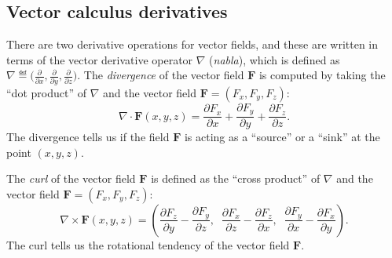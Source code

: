 	\subsection{Vector calculus derivatives}

		There are two derivative operations for vector fields,
		and these are written in terms of the vector derivative operator $\nabla$ (\emph{nabla}),
		which is defined as $\nabla \eqdef \big( \frac{\partial}{\partial x}, \frac{\partial}{\partial y}, \frac{\partial}{\partial z} \big)$.
		The \emph{divergence} of the vector field $\mathbf{F}$
		is computed by taking the ``dot product'' of $\nabla$ and the vector field $\mathbf{F} = (F_x, F_y, F_z)$:
		\[
			\nabla \cdot \mathbf{F}(x,y,z)
				= \frac{\partial F_x}{\partial x} 	+ \frac{\partial F_y}{\partial y}	+ \frac{\partial F_z}{\partial z}.
		\]
		The divergence tells us if the field $\mathbf{F}$
		is acting as a ``source'' or a ``sink'' at the point $(x,y,z)$.


		The \emph{curl} of the vector field $\mathbf{F}$ is defined as the ``cross product''
		of $\nabla$ and the vector field $\mathbf{F} = (F_x, F_y, F_z)$:
		\[
			\nabla \times \mathbf{F}(x,y,z)
				= 	\left(
						\frac{\partial F_z}{\partial y} - \frac{\partial F_y}{\partial z}, \;\;
						\frac{\partial F_x}{\partial z} - \frac{\partial F_z}{\partial x}, \;\;
						\frac{\partial F_y}{\partial x} - \frac{\partial F_x}{\partial y}
					\right)\!.
		\]
		The curl tells us the rotational tendency of the vector field $\mathbf{F}$.








